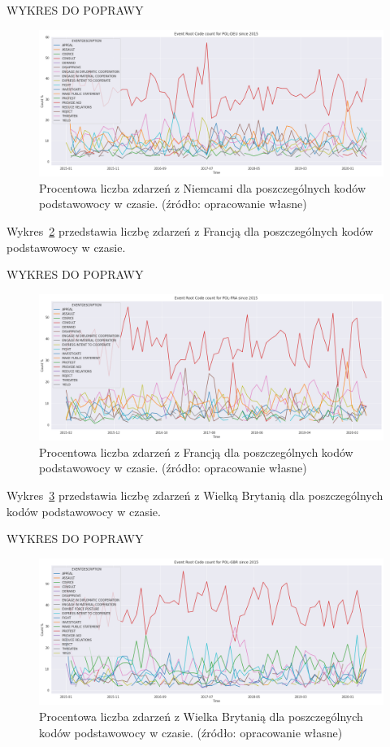 \documentclass[11pt]{report}
\begin{document}
    WYKRES DO POPRAWY
    \begin{figure}[ht!]
        \centering
        \includegraphics[width=1 \textwidth]{fig/PL/POLDEUERCperc.png}
        \caption{Procentowa liczba zdarzeń z Niemcami dla poszczególnych kodów podstawowocy w czasie. (źródło: opracowanie własne)}
        \label{fig:PLDEUERC}
    \end{figure}

    Wykres~\ref{fig:PLFRAERC} przedstawia liczbę zdarzeń z Francją dla poszczególnych kodów podstawowocy w czasie.


    WYKRES DO POPRAWY
    \begin{figure}[ht!]
        \centering
        \includegraphics[width=1 \textwidth]{fig/PL/POLFRAERCperc.png}
        \caption{Procentowa liczba zdarzeń z Francją dla poszczególnych kodów podstawowocy w czasie. (źródło: opracowanie własne)}
        \label{fig:PLFRAERC}
    \end{figure}

    Wykres~\ref{fig:PLGBRERC} przedstawia liczbę zdarzeń z Wielką Brytanią dla poszczególnych kodów podstawowocy w czasie.

    WYKRES DO POPRAWY
    \begin{figure}[ht!]
        \centering
        \includegraphics[width=1 \textwidth]{fig/PL/POLGBRERCperc.png}
        \caption{Procentowa liczba zdarzeń z Wielka Brytanią dla poszczególnych kodów podstawowocy w czasie. (źródło: opracowanie własne)}
        \label{fig:PLGBRERC}
    \end{figure}
\end{document}
